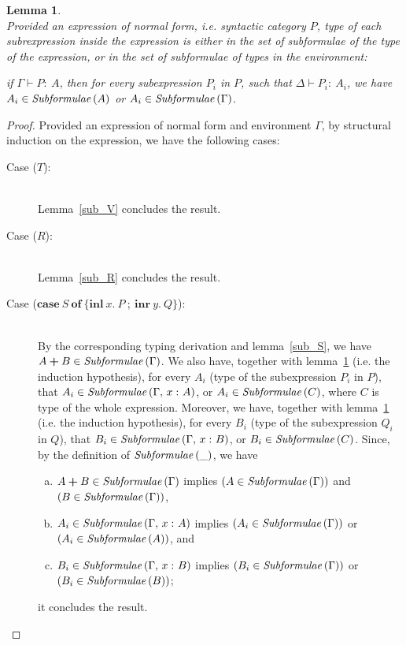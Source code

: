 \documentclass[a4paper]{article}
\newcommand{\typecolor}{}
\newcommand{\termcolor}{}
\newcommand{\tp}[1]{{\typecolor #1}}
\newcommand{\tm}[1]{{\termcolor #1}}
\newtheorem{lemma}[theorem]{Lemma}
\newcommand{\typsum}[2]{#1\boldsymbol{+}#2}
\newcommand{\expcas}[5]{\mathbf{case}\ #1\ \mathbf{of}\ \boldsymbol{\{}\mathbf{inl}\ #2.\ #3\ \boldsymbol{;}\ \mathbf{inr}\ #4.\ #5\boldsymbol{\}}}
\newcommand{\typing}[2]{\tm{#1:\ }\tp{#2}}
\newcommand{\typenvcon}[2]{\tp{\Gamma,}\ \typing{#1}{#2}}
\newcommand{\txt}[1]{\text{\textit{#1}}}
\newcommand{\subformulae}[1]{\txt{Subformulae}\,(#1)}
\begin{document}
\begin{lemma}\ \\
\label{sub_P}
Provided an expression of normal form, i.e. syntactic category $P$,
type of each subrexpression inside the expression is either in the set of
subformulae of the type of the expression, or in the set
of subformulae of types in the environment:

 if $\Gamma \vdash \typing{P}{A}$, then for every subexpression $P_i$
 in $P$, such that $\Delta \vdash \typing{P_i}{A_i}$, we have $A_i \in
 \subformulae{A}$ or $A_i \in \subformulae{\Gamma}$. 
\end{lemma}
\begin{proof}
Provided an expression of normal form and environment $\Gamma$,
by structural induction on the expression, we have the following cases:
\begin{description}
\item[Case ($T$):]\ \\
  Lemma~\ref{sub_V} concludes the result.
\item[Case ($R$):]\ \\
  Lemma~\ref{sub_R} concludes the result.
\item[Case ($\expcas{S}{x}{P}{y}{Q}$):]\ \\
  By the corresponding typing derivation and lemma~\ref{sub_S}, we
  have $\typsum{A}{B} \in \subformulae{\Gamma}$. We also have,
  together with lemma~\ref{sub_P} (i.e. the induction hypothesis), for
  every $A_i$ (type of the subexpression $P_i$ in $P$), that $A_i \in
  \subformulae{\typenvcon{x}{A}}$, or $A_i \in \subformulae{C}$, where
  $C$ is type of the whole expression. Moreover, we have, together
  with lemma~\ref{sub_P} (i.e. the induction hypothesis), for every
  $B_i$ (type of the subexpression $Q_i$ in $Q$), that $B_i \in
  \subformulae{\typenvcon{x}{B}}$, or $B_i \in \subformulae{C}$.
  Since, by the definition of $\subformulae{\_}$, we have
  \begin{enumerate}[(a)] 
     \item $\typsum{A}{B} \in \subformulae{\Gamma}$ implies $(A \in \subformulae{\Gamma})$ and $(B \in \subformulae{\Gamma})$,
     \item $A_i \in \subformulae{\typenvcon{x}{A}}$ implies $(A_i \in \subformulae{\Gamma})$ or $(A_i \in \subformulae{A})$, and
     \item $B_i \in \subformulae{\typenvcon{x}{B}}$ implies $(B_i \in \subformulae{\Gamma})$ or $(B_i \in \subformulae{B})$; 
  \end{enumerate}
  it concludes the result. 

\end{description}
\end{proof}
\end{document}
